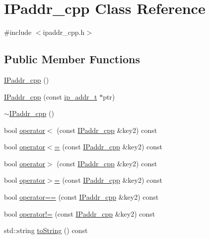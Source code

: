 \hypertarget{classIPaddr__cpp}{}\section{I\+Paddr\+\_\+cpp Class Reference}
\label{classIPaddr__cpp}


{\ttfamily \#include $<$ipaddr\+\_\+cpp.\+h$>$}

\subsection*{Public Member Functions}
\begin{DoxyCompactItemize}
\item 
\hyperlink{classIPaddr__cpp_a450c35472ab98d00f27b041e03f82978}{I\+Paddr\+\_\+cpp} ()
\item 
\hyperlink{classIPaddr__cpp_a150c0d3d33c93709f21c56d617893547}{I\+Paddr\+\_\+cpp} (const \hyperlink{group__ur__ipaddr_ga25f353236a342b23c6eb35f4a87176b5}{ip\+\_\+addr\+\_\+t} $\ast$ptr)
\item 
\hyperlink{classIPaddr__cpp_ae4af8442dd70b4143b7acbc10baf83e0}{$\sim$\+I\+Paddr\+\_\+cpp} ()
\item 
bool \hyperlink{classIPaddr__cpp_acbb4296c7de0b11ab386125deddfe853}{operator$<$} (const \hyperlink{classIPaddr__cpp}{I\+Paddr\+\_\+cpp} \&key2) const 
\item 
bool \hyperlink{classIPaddr__cpp_aaf92bb4645a643a780a98d73d6abe63c}{operator$<$=} (const \hyperlink{classIPaddr__cpp}{I\+Paddr\+\_\+cpp} \&key2) const 
\item 
bool \hyperlink{classIPaddr__cpp_a28acfd6e680b48394363f102273fdec4}{operator$>$} (const \hyperlink{classIPaddr__cpp}{I\+Paddr\+\_\+cpp} \&key2) const 
\item 
bool \hyperlink{classIPaddr__cpp_a89c93a9f1647b548e3ec0c444a8fe4b4}{operator$>$=} (const \hyperlink{classIPaddr__cpp}{I\+Paddr\+\_\+cpp} \&key2) const 
\item 
bool \hyperlink{classIPaddr__cpp_afb24038927369d121a7f78e8800b1b4b}{operator==} (const \hyperlink{classIPaddr__cpp}{I\+Paddr\+\_\+cpp} \&key2) const 
\item 
bool \hyperlink{classIPaddr__cpp_a8b54c0118c6a0ff8bb920e3197e1275d}{operator!=} (const \hyperlink{classIPaddr__cpp}{I\+Paddr\+\_\+cpp} \&key2) const 
\item 
std\+::string \hyperlink{classIPaddr__cpp_abeee306f1938a460601f686fcaea9867}{to\+String} () const 
\end{DoxyCompactItemize}
